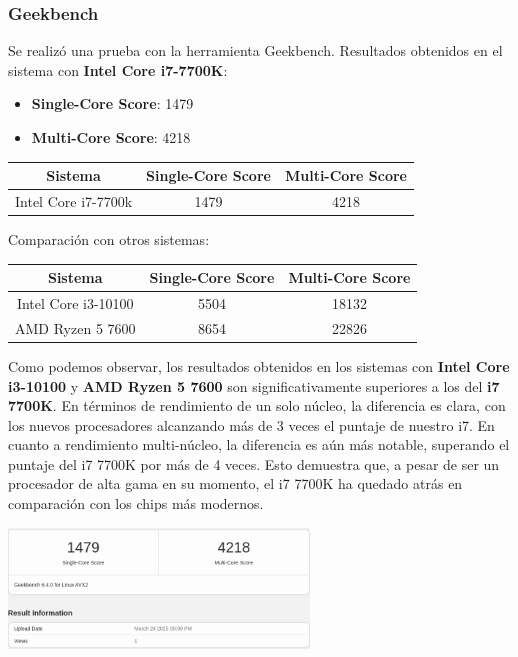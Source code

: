 \subsubsection*{Geekbench}
Se realizó una prueba con la herramienta Geekbench.  
Resultados obtenidos en el sistema con \textbf{Intel Core i7-7700K}:
\begin{itemize}
    \item \textbf{Single-Core Score}: 1479
    \item \textbf{Multi-Core Score}: 4218
\end{itemize}
\begin{center}
    \begin{tabular}{|c|c|c|}
    \hline
    \textbf{Sistema} & \textbf{Single-Core Score} & \textbf{Multi-Core Score} \\
    \hline
    Intel Core i7-7700k & 1479 & 4218 \\
    \hline
    \end{tabular}
    \end{center}
Comparación con otros sistemas:

\begin{center}
\begin{tabular}{|c|c|c|}
\hline
\textbf{Sistema} & \textbf{Single-Core Score} & \textbf{Multi-Core Score} \\
\hline
Intel Core i3-10100 & 5504 & 18132 \\
\hline
AMD Ryzen 5 7600 & 8654 & 22826 \\
\hline
\end{tabular}
\end{center}

\noindent Como podemos observar, los resultados obtenidos en los sistemas con \textbf{Intel Core i3-10100} y \textbf{AMD Ryzen 5 7600} son significativamente superiores a los del \textbf{i7 7700K}. En términos de rendimiento de un solo núcleo, la diferencia es clara, con los nuevos procesadores alcanzando más de 3 veces el puntaje de nuestro i7. En cuanto a rendimiento multi-núcleo, la diferencia es aún más notable, superando el puntaje del i7 7700K por más de 4 veces. Esto demuestra que, a pesar de ser un procesador de alta gama en su momento, el i7 7700K ha quedado atrás en comparación con los chips más modernos.

\begin{center}
\includegraphics[width=0.6\textwidth]{img/Geekbench.png}
\end{center}



